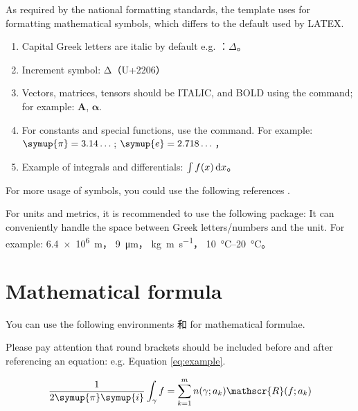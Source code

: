 As required by the national formatting standards, the template uses  for formatting mathematical symbols, which differs to the default used by LATEX. 

\begin{enumerate}
  \item Capital Greek letters are italic by default e.g. ：$\Delta$。
  \item Increment symbol: $\increment$（U+2206）
  \item Vectors, matrices, tensors should be ITALIC, and BOLD using the  command; for example: $\symbf{A}$, $\symbf{\alpha}$.
  \item For constants and special functions, use the  command. For example:
    $\symup{\pi} = 3.14\dots$; $\symup{e} = 2.718\dots$，
  \item Example of integrals and differentials: $\int f(x) \mathop{}\!\mathrm{d} x$。
\end{enumerate}

For more usage of symbols, you could use the following references
\href{http://mirrors.ctan.org/macros/latex/contrib/unicode-math/unicode-math.pdf}{}
\href{http://mirrors.ctan.org/macros/latex/contrib/unicode-math/unimath-symbols.pdf}{}.

For units and metrics, it is recommended to use the following package:
\href{http://mirrors.ctan.org/macros/latex/contrib/siunitx/siunitx.pdf}{}
It can conveniently handle the space between Greek letters/numbers and the unit. For example:
\SI{6.4e6}{m}，
\SI{9}{\micro\meter}，
\si{kg.m.s^{-1}}，
\SIrange{10}{20}{\degreeCelsius}。



\section{Mathematical formula}

You can use the following environments  和  for mathematical formulae.

Please pay attention that round brackets should be included before and after referencing an equation: e.g. Equation \eqref{eq:example}.

\begin{equation}
  \frac{1}{2 \symup{\pi} \symup{i}} \int_\gamma f = \sum_{k=1}^m n(\gamma; a_k) \mathscr{R}(f; a_k)
  \label{eq:example}
\end{equation}

